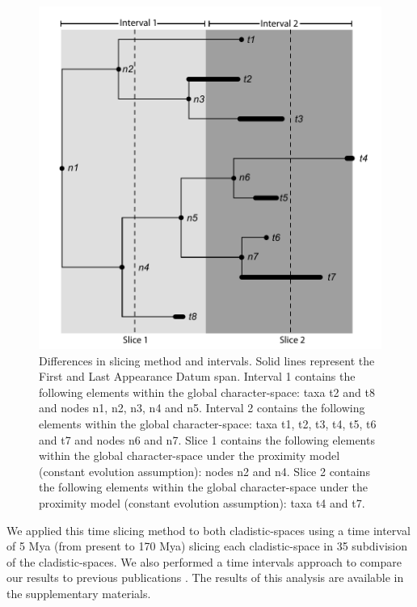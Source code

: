 \documentclass[12pt,letterpaper]{article}
\begin{document}
\begin{figure}[!htbp]
\centering
    \includegraphics[keepaspectratio=true]{Figures/Slicing.pdf}
\caption{Differences in slicing method and intervals. Solid lines represent the First and Last Appearance Datum span. Interval 1 contains the following elements within the global character-space: taxa t2 and t8 and nodes n1, n2, n3, n4 and n5. Interval 2 contains the following elements within the global character-space: taxa t1, t2, t3, t4, t5, t6 and t7 and nodes n6 and n7. Slice 1 contains the following elements within the global character-space under the proximity model (constant evolution assumption): nodes n2 and n4. Slice 2 contains the following elements within the global character-space under the proximity model (constant evolution assumption): taxa t4 and t7.}
\label{fig_slicing}
\end{figure}

We applied this time slicing method to both cladistic-spaces \citep{MEE3:MEE312084,beckancient2014} using a time interval of 5 Mya (from present to 170 Mya) slicing each cladistic-space in 35 subdivision of the cladistic-spaces.  We also performed a time intervals approach to compare our results to previous publications \citep[e.g.][]{Brusatte12092008,brusattedinosaur2012,toljagictriassic-jurassic2013}. The results of this analysis are available in the supplementary materials.
\end{document}
